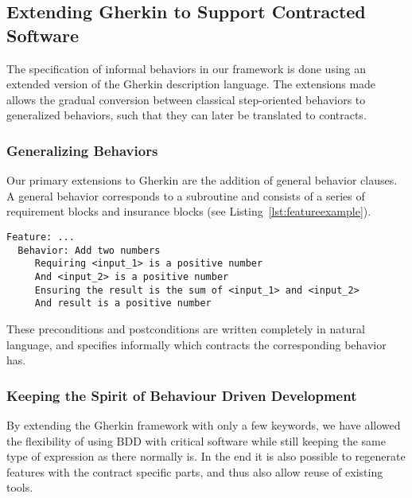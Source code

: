 \subsection{Extending Gherkin to Support Contracted Software}
\label{sub:Extending Gherkin to Support Contracted Software}


The specification of informal behaviors in our framework is done using an
extended version of the Gherkin description language.
The extensions made allows the gradual conversion between classical step-oriented behaviors to generalized behaviors, such that they can later be translated to contracts.


\subsubsection{Generalizing Behaviors}
\label{sub:Generalizing Behaviors}

Our primary extensions to Gherkin are the addition of general
behavior clauses. A general behavior corresponds to a subroutine
and consists of a series of requirement blocks and insurance blocks
(see Listing~\ref{lst:featureexample}).

\begin{lstlisting}[caption={General Behavior Description of Adding Natural Numbers},label={lst:featureexample}]
  Feature: ...
  Behavior: Add two numbers
     Requiring <input_1> is a positive number
     And <input_2> is a positive number
     Ensuring the result is the sum of <input_1> and <input_2>
     And result is a positive number
\end{lstlisting}


These preconditions and postconditions are written completely in
natural language, and specifies informally which contracts the corresponding
behavior has.

\subsubsection{Keeping the Spirit of Behaviour Driven Development}
\label{ssub:Keeping the Spirit of Behaviour Driven Development}
By extending the Gherkin framework with only a few keywords, we have allowed the flexibility of using BDD with critical software
while still keeping the same type of expression as there normally is. In the end it is also possible to regenerate features with
the contract specific parts, and thus also allow reuse of existing tools.


